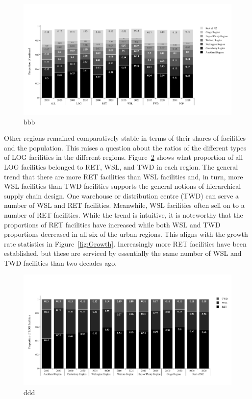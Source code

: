 \documentclass[3p, a4paper, authoryear, 11pt, fleqn, review]{elsarticle}
\begin{document}
\begin{figure}[h!]
    \centering
    \includegraphics[width=1.1\linewidth]{RegionalProp.png}
    \caption{bbb}
    \label{fig:RegionalProp}
\end{figure}

Other regions remained comparatively stable in terms of their shares of facilities and the population. This raises a question about the ratios of the different types of LOG facilities in the different regions. Figure~\ref{fig:FacProp} shows what proportion of all LOG facilities belonged to RET, WSL, and TWD in each region. The general trend that there are more RET facilities than WSL facilities and, in turn, more WSL facilities than TWD facilities supports the general notions of hierarchical supply chain design. One warehouse or distribution centre (TWD) can serve a number of WSL and RET facilities. Meanwhile, WSL facilities often sell on to a number of RET facilities. While the trend is intuitive, it is noteworthy that the proportions of RET facilities have increased while both WSL and TWD proportions decreased in all six of the urban regions. This aligns with the growth rate statistics in Figure~\ref{fig:Growth}. Increasingly more RET facilities have been established, but these are serviced by essentially the same number of WSL and TWD facilities than two decades ago.


\begin{figure}[h!]
    \centering
    \includegraphics[width=1.1\linewidth]{FacProp.png}
    \caption{ddd}
    \label{fig:FacProp}
\end{figure}
\end{document}

